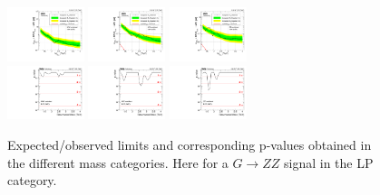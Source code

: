 \begin{figure}[h!]
\centering
\includegraphics[width=0.20\textwidth]{figures/analysis/search1/AN-15-211/limits/brazilianFlag_BulkZZ_WWLP_13TeV_wPDF.pdf}
\includegraphics[width=0.20\textwidth]{figures/analysis/search1/AN-15-211/limits/brazilianFlag_BulkZZ_WZLP_13TeV_wPDF.pdf}
\includegraphics[width=0.20\textwidth]{figures/analysis/search1/AN-15-211/limits/brazilianFlag_BulkZZ_ZZLP_13TeV_wPDF.pdf}\\
\includegraphics[width=0.20\textwidth]{figures/analysis/search1/AN-15-211/pvalues/pvalue_BulkZZinWW_low_purity.pdf}
\includegraphics[width=0.20\textwidth]{figures/analysis/search1/AN-15-211/pvalues/pvalue_BulkZZinWZ_low_purity.pdf}
\includegraphics[width=0.20\textwidth]{figures/analysis/search1/AN-15-211/pvalues/pvalue_BulkZZinZZ_low_purity.pdf}
\caption{Expected/observed limits and corresponding p-values obtained in the different mass categories. Here for a $G\rightarrow ZZ$ signal in the LP category.}
\label{fig:searchI:Limits_LPBulkZZ}
\end{figure}


